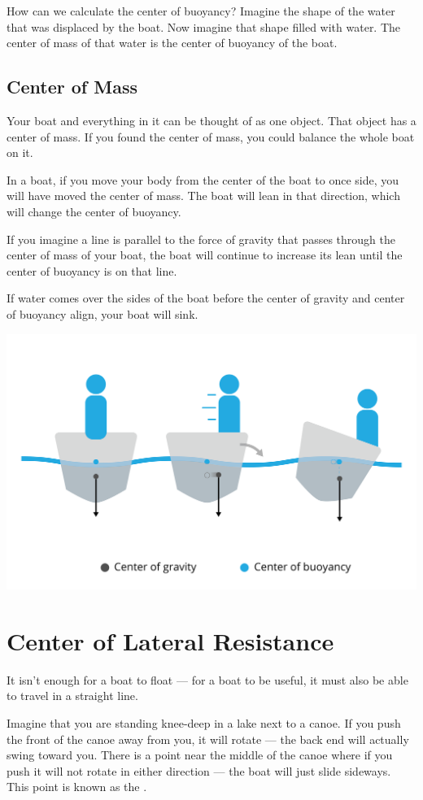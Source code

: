 How can we calculate the center of buoyancy?  Imagine the shape of the water that was displaced by the boat. Now imagine that shape filled with water. The center of mass of that water is the center of buoyancy of the boat.

\subsection{Center of Mass}
Your boat and everything in it can be thought of as one object.  That object has a center of mass. If you found the center of mass, you could balance the whole boat on it.

In a boat,  if you move your body from the center of the boat to once side, you will have moved the center of mass. The boat will lean in that direction, which will change the center of buoyancy.

If you imagine a line is parallel to the force of gravity that passes through the center of mass of your boat, the boat will continue to increase its lean until
the center of buoyancy is on that line.

If water comes over the sides of the boat before the center of gravity and center of buoyancy align, your boat will sink.

\begin{center}
    \includegraphics[width=.75\textwidth]{cgcm.png}

\end{center}

\section{Center of Lateral Resistance}

It isn't enough for a boat to float --- for a boat to be useful,  it must also be able to travel in a straight line.

Imagine that you are standing knee-deep in a lake next to a canoe.  If you push the front of the canoe away from you,  it will rotate --- the back end will actually
swing toward you. There is a point near the middle of the canoe where if you push it will not rotate in either direction --- the boat will just slide sideways.  This point is known as the .

